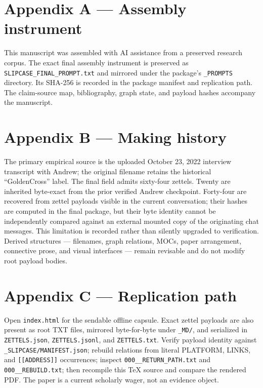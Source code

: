 \documentclass[11pt]{article}
\begin{document}
\appendix
\section*{Appendix A --- Assembly instrument}
This manuscript was assembled with AI assistance from a preserved research corpus. The exact final assembly instrument is preserved as \texttt{SLIPCASE\_FINAL\_PROMPT.txt} and mirrored under the package's \texttt{\_PROMPTS} directory. Its SHA-256 is recorded in the package manifest and replication path. The claim-source map, bibliography, graph state, and payload hashes accompany the manuscript.

\section*{Appendix B --- Making history}
The primary empirical source is the uploaded October 23, 2022 interview transcript with Andrew; the original filename retains the historical ``GoldenCross'' label. The final field admits sixty-four zettels. Twenty are inherited byte-exact from the prior verified Andrew checkpoint. Forty-four are recovered from zettel payloads visible in the current conversation; their hashes are computed in the final package, but their byte identity cannot be independently compared against an external mounted copy of the originating chat messages. This limitation is recorded rather than silently upgraded to verification. Derived structures --- filenames, graph relations, MOCs, paper arrangement, connective prose, and visual interfaces --- remain revisable and do not modify root payload bodies.

\section*{Appendix C --- Replication path}
Open \texttt{index.html} for the sendable offline capsule. Exact zettel payloads are also present as root TXT files, mirrored byte-for-byte under \texttt{\_MD/}, and serialized in \texttt{ZETTELS.json}, \texttt{ZETTELS.jsonl}, and \texttt{ZETTELS.txt}. Verify payload identity against \texttt{\_SLIPCASE/MANIFEST.json}; rebuild relations from literal PLATFORM, LINKS, and \texttt{[[ADDRESS]]} occurrences; inspect \texttt{000\_\_RETURN\_PATH.txt} and \texttt{000\_\_REBUILD.txt}; then recompile this TeX source and compare the rendered PDF. The paper is a current scholarly wager, not an evidence object.
\end{document}
